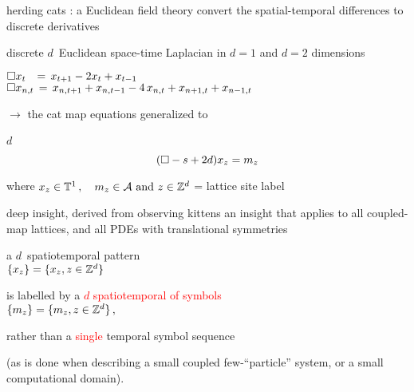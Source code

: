 \begin{frame}{herding cats : a Euclidean field theory
}
convert the spatial-temporal differences to discrete derivatives

\bigskip

discrete $d$\dmn\ Euclidean space-time Laplacian
in $d=1$ and $d=2$ dimensions

\bigskip

\(
\Box x_t \;\;\,=\, x_{t+1} - 2x_{t} + x_{t-1}
\)\\ \(
\Box x_{n,t} \,=\, x_{n,t+1} + x_{n,t-1}
- 4 \, x_{n,t} + x_{n+1,t} + x_{n-1, t}
\)

\medskip

$\to$ the cat map equations generalized  to
\begin{block}{$d$\dmn\ \catlatt}
\[
 (\Box -s+2d)x_{z} = m_z
\] %

\medskip

\end{block}

\bigskip

where
\(
  x_{z} \in  \mathbb{T}^{1}
    \,, \quad
  {\ensuremath{m_{z}}} \in \mathcal{A}
    \mbox{  and  }
  z\in \mathbb{Z}^{d}
\) = lattice site label
\end{frame}

\begin{frame}{deep insight, derived from observing kittens}
an insight that applies
to all coupled-map lattices, and all PDEs with translational symmetries

\bigskip

a $d$\dmn\ spatiotemporal pattern\\
\(
\{x_{z}\} = \{x_{z},  z\in \mathbb{Z}^{d}  \}
\)

\bigskip

is labelled by a \textcolor{red}{{\em $d$\dmn} spatiotemporal {\brick} of symbols}\\
\(
\{m_{z}\} = \{m_{z}, z\in \mathbb{Z}^{d}\}
\,,
\)

\bigskip

rather than a \textcolor{red}{single} temporal symbol sequence


\bigskip

(as is done
when describing a small coupled few-``particle'' system, or a small
computational domain).
\end{frame}


